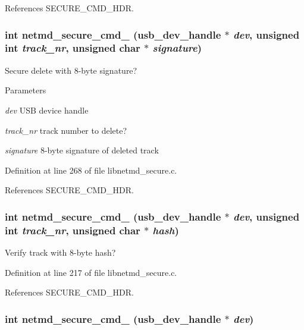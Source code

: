 References SECURE\_\-CMD\_\-HDR.
\subsubsection[{netmd\_\-secure\_\-cmd\_\-40}]{\setlength{\rightskip}{0pt plus 5cm}int netmd\_\-secure\_\-cmd\_ (usb\_\-dev\_\-handle $\ast$ {\em dev}, \/  unsigned int {\em track\_\-nr}, \/  unsigned char $\ast$ {\em signature})}\label{libnetmd__secure_8c_a310e69868d2ed87bb5219db4f9f57bcb}


Secure delete with 8-\/byte signature? 
\begin{DoxyParams}{Parameters}
\item[{\em dev}]USB device handle \item[{\em track\_\-nr}]track number to delete? \item[{\em signature}]8-\/byte signature of deleted track \end{DoxyParams}


Definition at line 268 of file libnetmd\_\-secure.c.

References SECURE\_\-CMD\_\-HDR.
\subsubsection[{netmd\_\-secure\_\-cmd\_\-48}]{\setlength{\rightskip}{0pt plus 5cm}int netmd\_\-secure\_\-cmd\_ (usb\_\-dev\_\-handle $\ast$ {\em dev}, \/  unsigned int {\em track\_\-nr}, \/  unsigned char $\ast$ {\em hash})}\label{libnetmd__secure_8c_ae04a6dd888cfe0981ddf1214ae9887a7}


Verify track with 8-\/byte hash? 

Definition at line 217 of file libnetmd\_\-secure.c.

References SECURE\_\-CMD\_\-HDR.
\subsubsection[{netmd\_\-secure\_\-cmd\_\-80}]{\setlength{\rightskip}{0pt plus 5cm}int netmd\_\-secure\_\-cmd\_ (usb\_\-dev\_\-handle $\ast$ {\em dev})}\label{libnetmd__secure_8c_a0b4969a8fc4e247d303a611ed6f12f2f}


